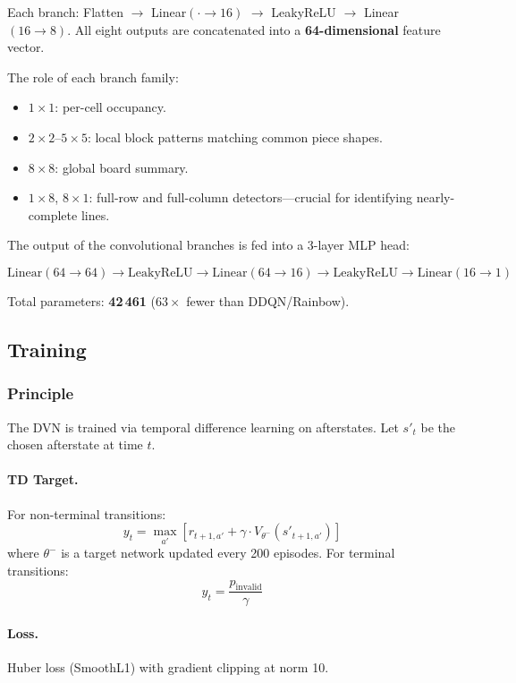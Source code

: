 \documentclass[10pt]{article}
\begin{document}
Each branch: Flatten $\to$ Linear$(\cdot\to16)$ $\to$ LeakyReLU $\to$ Linear$(16\to8)$.
All eight outputs are concatenated into a \textbf{64-dimensional} feature vector.

The role of each branch family:
\begin{itemize}
    \item $1\times1$: per-cell occupancy.
    \item $2\times2$--$5\times5$: local block patterns matching common piece shapes.
    \item $8\times8$: global board summary.
    \item $1\times8$, $8\times1$: full-row and full-column detectors---crucial for identifying nearly-complete lines.
\end{itemize}

The output of the convolutional branches is fed into a 3-layer MLP head:

\[
\text{Linear}(64 \to 64) \to \text{LeakyReLU} \to \text{Linear}(64 \to 16) \to \text{LeakyReLU} \to \text{Linear}(16 \to 1)
\]

Total parameters: \textbf{42\,461} ($63\times$ fewer than DDQN/Rainbow).

\subsection{Training}

\subsubsection{Principle}

The DVN is trained via temporal difference learning on afterstates. Let $s'_t$ be the chosen afterstate at time $t$.

\paragraph{TD Target.} For non-terminal transitions:
\[
y_t = \max_{a'} \left[ r_{t+1,a'} + \gamma \cdot V_{\theta^-}(s'_{t+1,a'}) \right]
\]
where $\theta^-$ is a target network updated every 200 episodes. For terminal transitions:
\[
y_t = \frac{p_{\text{invalid}}}{\gamma}
\]

\paragraph{Loss.} Huber loss (SmoothL1) with gradient clipping at norm 10.
\end{document}
